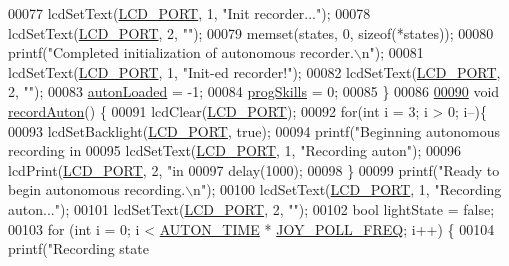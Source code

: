 \begin{DoxyCode}
{{{00077     lcdSetText(\hyperlink{lcdmsg_8h_abcf42bd88b3c36193f301ca25b033875}{LCD\_PORT}, 1, \textcolor{stringliteral}{"Init recorder..."});
00078     lcdSetText(\hyperlink{lcdmsg_8h_abcf42bd88b3c36193f301ca25b033875}{LCD\_PORT}, 2, \textcolor{stringliteral}{""});
00079     memset(states, 0, \textcolor{keyword}{sizeof}(*states));
00080     printf(\textcolor{stringliteral}{"Completed initialization of autonomous recorder.\(\backslash\)n"});
00081     lcdSetText(\hyperlink{lcdmsg_8h_abcf42bd88b3c36193f301ca25b033875}{LCD\_PORT}, 1, \textcolor{stringliteral}{"Init-ed recorder!"});
00082     lcdSetText(\hyperlink{lcdmsg_8h_abcf42bd88b3c36193f301ca25b033875}{LCD\_PORT}, 2, \textcolor{stringliteral}{""});
00083     \hyperlink{autonrecorder_8c_a4e72d907ee74449b71b5e20943f4217e}{autonLoaded} = -1;
00084     \hyperlink{autonrecorder_8c_aa2eda471576bdbaf33835a71da9bc616}{progSkills} = 0;
00085 \}
00086 
\hypertarget{autonrecorder_8c_source.tex_l00090}{}\hyperlink{autonrecorder_8h_a1611f78b8c904848dcc98ae4b0b5b22b}{00090} \textcolor{keywordtype}{void} \hyperlink{autonrecorder_8c_a1611f78b8c904848dcc98ae4b0b5b22b}{recordAuton}() \{
00091     lcdClear(\hyperlink{lcdmsg_8h_abcf42bd88b3c36193f301ca25b033875}{LCD\_PORT});
00092     \textcolor{keywordflow}{for}(\textcolor{keywordtype}{int} i = 3; i > 0; i--)\{
00093         lcdSetBacklight(\hyperlink{lcdmsg_8h_abcf42bd88b3c36193f301ca25b033875}{LCD\_PORT}, \textcolor{keyword}{true});
00094         printf(\textcolor{stringliteral}{"Beginning autonomous recording in %
00095         lcdSetText(\hyperlink{lcdmsg_8h_abcf42bd88b3c36193f301ca25b033875}{LCD\_PORT}, 1, \textcolor{stringliteral}{"Recording auton"});
00096         lcdPrint(\hyperlink{lcdmsg_8h_abcf42bd88b3c36193f301ca25b033875}{LCD\_PORT}, 2, \textcolor{stringliteral}{"in %
00097         delay(1000);
00098     \}
00099     printf(\textcolor{stringliteral}{"Ready to begin autonomous recording.\(\backslash\)n"});
00100     lcdSetText(\hyperlink{lcdmsg_8h_abcf42bd88b3c36193f301ca25b033875}{LCD\_PORT}, 1, \textcolor{stringliteral}{"Recording auton..."});
00101     lcdSetText(\hyperlink{lcdmsg_8h_abcf42bd88b3c36193f301ca25b033875}{LCD\_PORT}, 2, \textcolor{stringliteral}{""});
00102     \textcolor{keywordtype}{bool} lightState = \textcolor{keyword}{false};
00103     \textcolor{keywordflow}{for} (\textcolor{keywordtype}{int} i = 0; i < \hyperlink{autonrecorder_8h_aa19f7c427989a0a67f55958c610d0355}{AUTON\_TIME} * \hyperlink{autonrecorder_8h_a3d2260a30e7ce727bef0402edee4b205}{JOY\_POLL\_FREQ}; i++) \{
00104         printf(\textcolor{stringliteral}{"Recording state %
}}}}}}
\end{DoxyCode}
